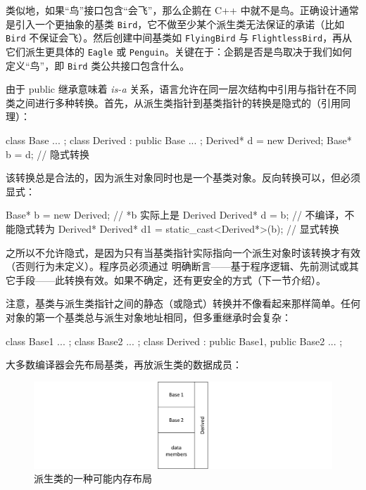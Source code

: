 类似地，如果“鸟”接口包含“会飞”，那么企鹅在 C++ 中就不是鸟。正确设计通常是引入一个更抽象的基类 \texttt{Bird}，它不做至少某个派生类无法保证的承诺（比如 \texttt{Bird} 不保证会飞）。然后创建中间基类如 \texttt{FlyingBird} 与 \texttt{FlightlessBird}，再从它们派生更具体的 \texttt{Eagle} 或 \texttt{Penguin}。关键在于：企鹅是否是鸟取决于我们如何定义“鸟”，即 \texttt{Bird} 类公共接口包含什么。

由于 public 继承意味着 \emph{is-a} 关系，语言允许在同一层次结构中引用与指针在不同类之间进行多种转换。首先，从派生类指针到基类指针的转换是隐式的（引用同理）：

\begin{code}
class Base { ... };
class Derived : public Base { ... };
Derived* d = new Derived;
Base* b = d;    // 隐式转换
\end{code}

该转换总是合法的，因为派生对象同时也是一个基类对象。反向转换可以，但必须显式：

\begin{code}
Base* b = new Derived;     // *b 实际上是 Derived
Derived* d = b; // 不编译，不能隐式转为 Derived*
Derived* d1 =
     static_cast<Derived*>(b);    // 显式转换
\end{code}

之所以不允许隐式，是因为只有当基类指针实际指向一个派生对象时该转换才有效（否则行为未定义）。程序员必须通过  明确断言——基于程序逻辑、先前测试或其它手段——此转换有效。如果不确定，还有更安全的方式（下一节介绍）。

注意，基类与派生类指针之间的静态（或隐式）转换并不像看起来那样简单。任何对象的第一个基类总与派生对象地址相同，但多重继承时会复杂：

\begin{code}
class Base1 { ... };
class Base2 { ... };
class Derived : public Base1, public Base2 { ... };
\end{code}

大多数编译器会先布局基类，再放派生类的数据成员：
\begin{figure}[H]
\centering
\includegraphics[keepaspectratio]{./image/Figure_1.1_B19262.jpg}
\caption{派生类的一种可能内存布局}
\label{fig1}
\end{figure}

